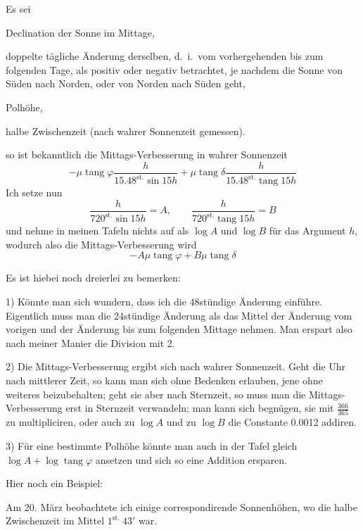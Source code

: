 Es sei
\begin{list}{}{\setlength{\leftmargin}{1.8em}\setlength{\labelwidth}{1.2em}\setlength{\labelsep}{.6em}\setlength{\itemsep}{0pt}\setlength{\parsep}{0pt}}
\item[$\delta$] Declination der Sonne im Mittage,
\item[$\mu$] doppelte tägliche Änderung derselben, d.\ i.\ vom vorhergehenden bis zum folgenden Tage, als positiv oder negativ betrachtet, je nachdem die Sonne von Süden nach Norden, oder von Norden nach Süden geht,
\item[$\varphi$] Polhöhe,
\item[$h$] halbe Zwischenzeit (nach wahrer Sonnenzeit gemessen).
\end{list}
so ist bekanntlich die Mittags-Verbesserung in wahrer Sonnenzeit
\[
-\mu\operatorname{tang}\varphi\frac h{15.48^{\mathrm{st.}}\sin15h}+\mu\operatorname{tang}\delta\frac h{15.48^{\mathrm{st.}}\operatorname{tang}15h}
\]
Ich setze nun
\[
\frac h{720^{\mathrm{st.}}\sin15h}=A,\qquad\frac h{720^{\mathrm{st.}}\operatorname{tang}15h}=B
\]
und nehme in meinen Tafeln nichts auf als $\log A$ und $\log B$ für das Argument $h$, wodurch also die Mittags-Verbesserung wird
\[
-A\mu\operatorname{tang}\varphi+B\mu\operatorname{tang}\delta
\]

Es ist hiebei noch dreierlei zu bemerken:

1) Könnte man sich wundern, dass ich die 48stündige Änderung einführe. Eigentlich muss man die 24stündige Änderung als das Mittel der Änderung vom vorigen und der Änderung bis zum folgenden Mittage nehmen. Man erspart also nach meiner Manier die Division mit 2.

2) Die Mittags-Verbesserung ergibt sich nach wahrer Sonnenzeit. Geht die Uhr nach mittlerer Zeit, so kann man sich ohne Bedenken erlauben, jene ohne weiteres beizubehalten; geht sie aber nach Sternzeit, so muss man die Mittags-Verbesserung erst in Sternzeit verwandeln; man kann sich begnügen, sie mit $\frac{366}{365}$ zu multipliciren, oder auch zu $\log A$ und zu $\log B$ die Constante 0.0012 addiren.

3) Für eine bestimmte Polhöhe könnte man auch in der Tafel gleich $\log A+\log\operatorname{tang}\varphi$ ansetzen und sich so eine Addition ersparen.

Hier noch ein Beispiel:

Am 20. März beobachtete ich einige correspondirende Sonnenhöhen, wo die halbe Zwischenzeit im Mittel $1^{\mathrm{st.}}\ 43'$ war.
%

